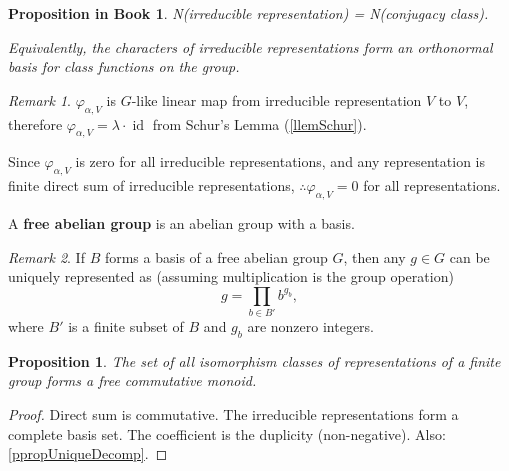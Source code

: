 \documentclass[12pt, letterpaper]{article}
\newcommand{\idt}{\operatorname{id}}
\newtheorem{prop}{Proposition}[section]
\theoremstyle{definition}
\theoremstyle{remark}
\newtheorem*{rem*}{Remark}
\theoremstyle{definition}
\theoremstyle{plain}
\newtheorem{pprop}[exe]{Proposition in Book}
\numberwithin{equation}{section}
\begin{document}
	\begin{pprop}
		N(irreducible representation) = N(conjugacy class).
		
		Equivalently, the characters of irreducible representations form an 
		orthonormal basis for class functions on the group.
	\end{pprop}
	\begin{rem*}
		$\varphi_{\alpha,V}$ is $G$-like linear map from irreducible representation $V$ to $V$,
		therefore $\varphi_{\alpha,V}=\lambda \cdot \idt$ from Schur's Lemma (\autoref{llemSchur}).
		
		Since $\varphi_{\alpha,V}$ is zero for all irreducible representations,
		and any representation is finite direct sum of irreducible representations,
		$\therefore\varphi_{\alpha,V}=0$ for all representations.
	\end{rem*}

	\begin{def*}
		A \textbf{free abelian group} is an abelian group with a basis.
	\end{def*}
	\begin{rem*}
		If $B$ forms a basis of a free abelian group $G$, then any $g\in G$ can be uniquely represented as
		(assuming multiplication is the group operation)
		\[ g = \prod_{b\in B'} b^{g_{b}}, \]
		where $B'$ is a finite subset of $B$ and $g_b$ are nonzero integers.
	\end{rem*}
	\begin{prop}
		The set of all isomorphism 
		classes of representations of a finite group forms a free commutative monoid.
	\end{prop}
	\begin{proof}
		Direct sum is commutative.
		The irreducible representations form a complete basis set.
		The coefficient is the duplicity (non-negative).
		Also: \autoref{ppropUniqueDecomp}.
	\end{proof}
	
\end{document}
